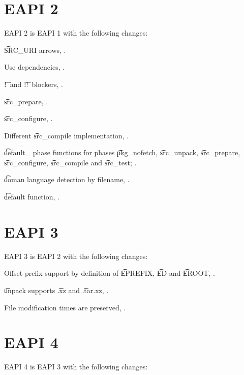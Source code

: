 \section*{EAPI 2}

EAPI 2 is EAPI 1 with the following changes:

\begin{compactitem}
\item \t{SRC_URI} arrows, .
\item Use dependencies, .
\item \t{!}\ and \t{!!}\ blockers, .
\item \t{src_prepare}, .
\item \t{src_configure}, .
\item Different \t{src_compile} implementation, .
\item \t{default_} phase functions for phases \t{pkg_nofetch}, \t{src_unpack}, \t{src_prepare},
    \t{src_configure}, \t{src_compile} and \t{src_test}; .
\item \t{doman} language detection by filename, .
\item \t{default} function, .
\end{compactitem}

\section*{EAPI 3}

EAPI 3 is EAPI 2 with the following changes:
\begin{compactitem}
\item Offset-prefix support by definition of \t{EPREFIX}, \t{ED} and \t{EROOT},
    .
\item \t{unpack} supports \t{.xz} and \t{.tar.xz}, .
\item File modification times are preserved, .
\end{compactitem}

\section*{EAPI 4}

EAPI 4 is EAPI 3 with the following changes:

